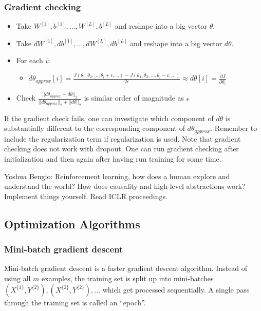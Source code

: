 \documentclass{article}
\begin{document}
\subsubsection{Gradient checking}
\begin{itemize}
  \item Take $W^{[1]},b^{[1]},\ldots,W^{[L]},b^{[L]}$ and reshape into a big vector $\theta$.
  \item Take $dW^{[1]},db^{[1]},\ldots,dW^{[L]},db^{[L]}$ and reshape into a big vector $d\theta$.
  \item For each $i$:
    \begin{itemize}
      \item $d\theta_{approx}[i]=
        \frac{J(\theta_1,\theta_2,\ldots,\theta_i+\epsilon,\ldots)- J(\theta_1,\theta_2,\ldots,\theta_i-\epsilon,\ldots)}{2\epsilon}
        \approx d\theta[i]=\frac{\partial J}{\partial\theta_i}$
    \end{itemize}
  \item Check $\frac{||d\theta_{approx}-d\theta||_2}{||d\theta_{approx}||_2+||d\theta||_2}$ is similar order of magnitude as  $\epsilon$
\end{itemize}
If the gradient check fails, one can investigate which component of $d\theta$ is substantially different to
the corresponding component of $d\theta_{approx}$.
Remember to include the regularization term if regularization is used.
Note that gradient checking does not work with dropout.
One can run gradient checking after initialization and then again after having run training for some time.

Yoshua Bengio: Reinforcement learning, how does a human explore and understand the world?
How does causality and high-level abstractions work?
Implement things yourself. Read ICLR proceedings.

\subsection{Optimization Algorithms}
\subsubsection{Mini-batch gradient descent}
Mini-batch gradient descent is a faster gradient descent algorithm.
Instead of using all $m$ examples, the training set is split up into mini-batches
$(X^{\{1\}},Y^{\{2\}}), (X^{\{2\}},Y^{\{2\}}), \ldots$ which get processed sequentially.
A single pass through the training set is called an ``epoch''.
\end{document}
